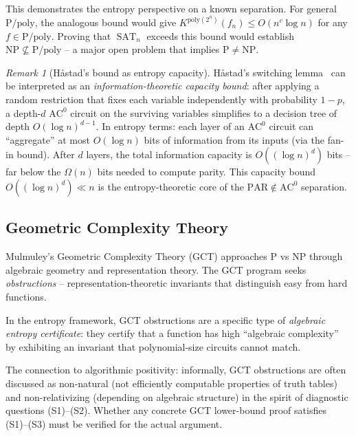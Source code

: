 \documentclass[aps,prd,twocolumn,superscriptaddress,nofootinbib]{revtex4-2}
\theoremstyle{definition}
\theoremstyle{remark}
\newtheorem{remark}[theorem]{Remark}
\DeclareMathOperator{\SAT}{SAT}
\newcommand{\NP}{\mathrm{NP}}
\newcommand{\PP}{\mathrm{P}}
\begin{document}
This demonstrates the entropy perspective on a known separation. For general $\PP/\mathrm{poly}$, the analogous bound would give $K^{\mathrm{poly}(2^n)}(f_n) \leq O(n^c \log n)$ for any $f \in \PP/\mathrm{poly}$. Proving that $\SAT_n$ exceeds this bound would establish $\NP \not\subseteq \PP/\mathrm{poly}$ -- a major open problem that implies $\PP \neq \NP$.

\begin{remark}[H\r{a}stad's bound as entropy capacity]
\label{rem:hastad-entropy}
H\r{a}stad's switching lemma~\cite{Hastad1987} can be interpreted as an \emph{information-theoretic capacity bound}: after applying a random restriction that fixes each variable independently with probability $1-p$, a depth-$d$ $\mathrm{AC}^0$ circuit on the surviving variables simplifies to a decision tree of depth $O(\log n)^{d-1}$. In entropy terms: each layer of an $\mathrm{AC}^0$ circuit can ``aggregate'' at most $O(\log n)$ bits of information from its inputs (via the fan-in bound). After $d$ layers, the total information capacity is $O((\log n)^d)$ bits -- far below the $\Omega(n)$ bits needed to compute parity. This capacity bound $O((\log n)^d) \ll n$ is the entropy-theoretic core of the $\mathrm{PAR} \notin \mathrm{AC}^0$ separation.
\end{remark}

\subsection{Geometric Complexity Theory}

Mulmuley's Geometric Complexity Theory (GCT) \cite{Mulmuley2011} approaches $\PP$ vs $\NP$ through algebraic geometry and representation theory. The GCT program seeks \textit{obstructions} -- representation-theoretic invariants that distinguish easy from hard functions.

In the entropy framework, GCT obstructions are a specific type of \textit{algebraic entropy certificate}: they certify that a function has high ``algebraic complexity'' by exhibiting an invariant that polynomial-size circuits cannot match.

The connection to algorithmic positivity: informally, GCT obstructions are often discussed as non-natural (not efficiently computable properties of truth tables) and non-relativizing (depending on algebraic structure) in the spirit of diagnostic questions (S1)--(S2). Whether any concrete GCT lower-bound proof satisfies (S1)--(S3) must be verified for the actual argument.
\end{document}
